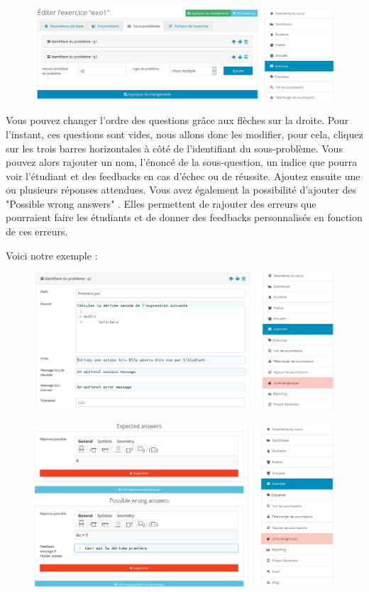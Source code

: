 \documentclass{article}
\begin{document}
\begin{figure}[!htb]
    \centering
    \includegraphics[scale=0.5]{images/sous_prob.png}
\end{figure}

Vous pouvez changer l'ordre des questions grâce aux flèches sur la droite.
Pour l'instant, ces questions sont vides, nous allons donc les modifier, pour cela, cliquez sur les trois barres horizontales à côté de l'identifiant du sous-problème. Vous pouvez alors rajouter un nom, l'énoncé de la sous-question, un indice que pourra voir l'étudiant et des feedbacks en cas d'échec ou de réussite. Ajoutez ensuite une ou plusieurs réponses attendues. Vous avez également la possibilité d'ajouter des "Possible wrong answers" . Elles permettent de rajouter des erreurs que pourraient faire les étudiants et de donner des feedbacks personnalisés en fonction de ces erreurs. 

Voici notre exemple :

\begin{figure}[!htb]
    \centering
    \includegraphics[scale=0.5]{images/sp.png}
\end{figure}

\begin{figure}[!htb]
    \centering
    \includegraphics[scale=0.5]{images/sp1.png}
\end{figure}
\end{document}
